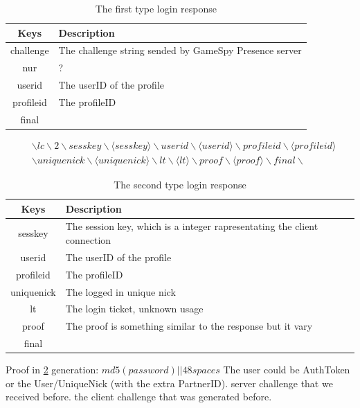 \documentclass[oneside,titlepage,a4paper]{report} %
\begin{document}
\begin{table}[H]
	\centering
	\begin{tabular}{|c|>{\centering\arraybackslash}p{8cm}|}
		\hline 
		Keys& Description  \\ 
		\hline 
		challenge & The challenge string sended by GameSpy Presence server  \\ 		
		\hline 
		nur & ? \\
		\hline 
 userid&The userID of the profile \\	\hline 
 profileid&The profileID \\	\hline 
 final& \\	\hline 
	\end{tabular} 
	\caption{The first type login response}
	\label{The first type login response}	
\end{table}

\begin{equation}\label{Login response string2}
\begin{split}
&\backslash lc \backslash 2 \backslash sesskey \backslash \langle sesskey \rangle  \backslash userid \backslash \langle userid \rangle \backslash profileid \backslash \langle profileid \rangle \\& \backslash uniquenick \backslash \langle uniquenick \rangle \backslash lt \backslash \langle lt \rangle \backslash proof \backslash \langle proof \rangle \backslash final \backslash
\end{split}	
\end{equation}

\begin{table}[H]
	\centering
	\begin{tabular}{|c|>{\centering\arraybackslash}p{8cm}|}
		\hline 
		Keys& Description  \\ 
		\hline 
		sesskey & The session key, which is a integer rapresentating the client connection \\ 		
		\hline 
		userid & The userID of the profile \\
		\hline 
		profileid&The profileID \\	\hline 
		uniquenick&The logged in unique nick \\	\hline 
		lt& The login ticket, unknown usage\\\hline
		proof& The proof is something similar to the response but it vary\\\hline
		final& \\
	\hline 
	\end{tabular} 
	\caption{The second type login response}
	\label{The second type login response}
\end{table}
Proof in \ref*{The second type login response} generation: $ md5(password)||48 spaces $
The user could be AuthToken or the User/UniqueNick (with the extra PartnerID).
server challenge that we received before.
the client challenge that was generated before.
\end{document}
